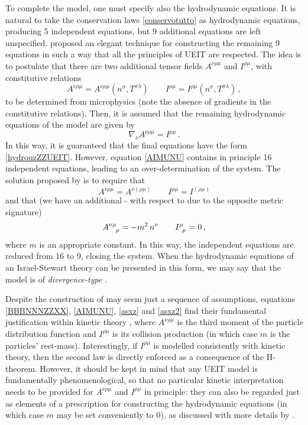 \documentclass[a4paper, amsfonts, amssymb, amsmath, reprint, twocolumn, showkeys, nofootinbib]{revtex4-2}
\begin{document}
To complete the model, one must specify also the hydrodynamic equations. It is natural to take the conservation laws \eqref{conservotutto} as hydrodynamic equations, producing 5 independent equations, but 9 additional equations are left unspecified. 
\citet{Liu1986} proposed an elegant technique for constructing the remaining 9 equations in such a way that all the principles of UEIT are respected. 
The idea is to postulate that there are two additional tensor fields $A^{\nu \rho \mu}$ and $I^{ \rho \mu}$, with constitutive relations
\begin{equation}\label{BBBNNNZZXX}
A^{\nu \rho \mu} = A^{\nu \rho \mu} (n^\sigma, T^{\sigma \lambda})   \quad \quad   I^{ \rho \mu} = I^{\rho \mu} (n^\sigma, T^{\sigma \lambda}) \, ,
\end{equation}
to be determined from microphysics (note the absence of gradients in the constitutive relations). Then, it is assumed that the remaining hydrodynamic equations of the model are  given by
\begin{equation}\label{AIMUNU}
\nabla_\nu A^{\nu \rho \mu} = I^{\rho \mu} \, .
\end{equation}
In this way, it is guaranteed that the final equations have the form \eqref{hydrouzZZUEIT}. However, equation \eqref{AIMUNU} contains in principle 16 independent equations, leading to an over-determination of the system. 
The solution proposed by \citet{Liu1986} is to require that
\begin{equation}\label{asxz}
A^{\nu \rho \mu} =A^{\nu (\rho \mu)}   \quad \quad   
I^{ \rho \mu} =I^{( \rho \mu)}
\end{equation}
and that (we have an additional - with respect to \citet{Liu1986} due to the opposite metric signature)
\begin{equation}\label{asxz2}
A\indices{^\nu ^\rho _\rho} = -m^2 \, n^\nu   \quad \quad   
I\indices{^\rho _\rho}=0 \, ,
\end{equation}
where $m$ is an appropriate constant. In this way, the independent equations are reduced from $16$ to $9$, closing the system. When the hydrodynamic equations of an Israel-Stewart theory can be presented in this form, we may say that the model is of \textit{divergence-type} \citep{rezzolla_book}.

Despite the construction of \citet{Liu1986} may seem just a sequence of assumptions, equations \eqref{BBBNNNZZXX}, \eqref{AIMUNU}, \eqref{asxz} and \eqref{asxz2} find their fundamental justification within kinetic theory \cite{cercignani_book}, where $A^{\nu \rho \mu}$ is the third moment of the particle distribution function and $I^{ \rho \mu}$ is its collision production (in which case $m$ is the particles' rest-mass). 
Interestingly, if $I^{ \rho \mu}$ is modelled consistently with kinetic theory, then the second law is directly enforced as a consequence of the H-theorem. 
However, it should be kept in mind that any UEIT model is fundamentally phenomenological, so that no particular kinetic interpretation needs to be provided for   $A^{\nu \rho \mu}$ and $I^{ \rho \mu}$ in principle: they can also be regarded just as elements of a prescription for constructing the hydrodynamic equations (in which case $m$ may be set conveniently to 0), as discussed with more details by \citet{GerochLindblom1990}.
\end{document}
